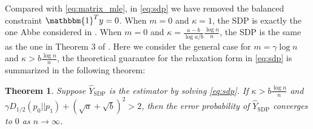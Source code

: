 \documentclass[conference]{IEEEtran}
\newtheorem{theorem}{Theorem}
\DeclareMathOperator{\SDP}{SDP}
\begin{document}
Compared with \eqref{eq:matrix_mle}, in \eqref{eq:sdp} we have removed
the balanced constraint $\mathbbm{1}^T y = 0$. When $m=0$ and $\kappa=1$,
the SDP is exactly the one Abbe considered in \cite{abbe2015exact}.
When $m=0$ and $\kappa=\frac{a-b}{\log a/b}\frac{\log n}{n}$, the SDP is
the same as the one in Theorem 3 of \cite{Hajek16}. Here we consider the
general case for $m=\gamma \log n$ and $\kappa > b\frac{\log n}{n}$,
the theoretical guarantee for the relaxation form in \eqref{eq:sdp} is summarized
in the following theorem:
\begin{theorem}\label{thm:sdp}
	Suppose $\hat{Y}_{\SDP}$ is the estimator by solving \eqref{eq:sdp}.
	If $\kappa > b\frac{\log n}{n}$ and $\gamma D_{1/2}(p_0||p_1) + (\sqrt{a} + \sqrt{b})^2 > 2$,
	then the error probability of $\hat{Y}_{\SDP}$ converges to $0$ as $n\to \infty$.
\end{theorem}
\end{document}
